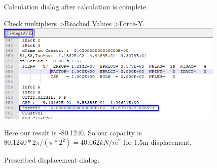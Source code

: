 \begin{landscape}
\begin{figure}[hbtp]
\begin{minipage}[c]{0.35\linewidth}
    \caption{Calculation dialog after calculation is complete.}
    \vfill
	Check multipliers \textgreater Reached Values \textgreater Force-Y.
    \includegraphics[width=\linewidth, height=0.3\textheight,keepaspectratio]{images/plx/a (23).png}
    \caption{Prescribed displacement dialog.}
	Here our result is -80.1240. So our capacity is $ 80.1240 * 2 \pi / (\pi * 2^2) = 40.062kN/m^2$ for 1.5m displacement.
    \vfill
  \end{minipage}
\vfill
\end{figure}
\end{landscape}
\pagebreak

